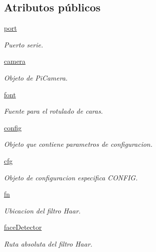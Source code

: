 \subsection*{Atributos públicos}
\begin{DoxyCompactItemize}
\item 
\mbox{\hyperlink{class_face_b_t_1_1_face_b_t_a7cdbf80ff5f32f8e8d0b36bfbc262e57}{port}}
\begin{DoxyCompactList}\small\item\em Puerto serie. \end{DoxyCompactList}\item 
\mbox{\hyperlink{class_face_b_t_1_1_face_b_t_a8a32158fd07c69e41e9236481a6d4c83}{camera}}
\begin{DoxyCompactList}\small\item\em Objeto de Pi\+Camera. \end{DoxyCompactList}\item 
\mbox{\hyperlink{class_face_b_t_1_1_face_b_t_aa3042288058c758f0bc83a01161d1c93}{font}}
\begin{DoxyCompactList}\small\item\em Fuente para el rotulado de caras. \end{DoxyCompactList}\item 
\mbox{\hyperlink{class_face_b_t_1_1_face_b_t_afde401ea3aeb8b1c6098a6525083a4f2}{config}}
\begin{DoxyCompactList}\small\item\em Objeto que contiene parametros de configuracion. \end{DoxyCompactList}\item 
\mbox{\hyperlink{class_face_b_t_1_1_face_b_t_a4456736625bb4b08b76951dbbf7b7eaa}{cfg}}
\begin{DoxyCompactList}\small\item\em Objeto de configuracion especifica C\+O\+N\+F\+IG. \end{DoxyCompactList}\item 
\mbox{\hyperlink{class_face_b_t_1_1_face_b_t_add39f81f6de74d12483f4180e5a06d29}{fn}}
\begin{DoxyCompactList}\small\item\em Ubicacion del filtro Haar. \end{DoxyCompactList}\item 
\mbox{\hyperlink{class_face_b_t_1_1_face_b_t_ad1494315f834e5591116b960b7c4b909}{face\+Detector}}
\begin{DoxyCompactList}\small\item\em Ruta absoluta del filtro Haar. \end{DoxyCompactList}\item 

\end{DoxyCompactItemize}
